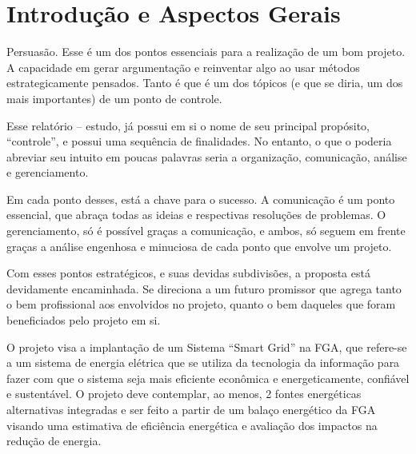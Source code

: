 \chapter[Introdução e Aspectos Gerais]{Introdução e Aspectos Gerais}

Persuasão. Esse é um dos pontos essenciais para a realização de um bom projeto. A capacidade em gerar argumentação e reinventar algo ao usar métodos estrategicamente pensados. Tanto é que é um dos tópicos (e que se diria, um dos mais importantes) de um ponto de controle.

Esse relatório – estudo, já possui em si o nome de seu principal propósito, “controle”, e possui uma sequência de finalidades. No entanto, o que o poderia abreviar seu intuito em poucas palavras seria a organização, comunicação, análise e gerenciamento.

Em cada ponto desses, está a chave para o sucesso. A comunicação é um ponto essencial, que abraça todas as ideias e respectivas resoluções de problemas.  O gerenciamento, só é possível graças a comunicação, e ambos, só seguem em frente graças a análise engenhosa e minuciosa de cada ponto que envolve um projeto.  

Com esses pontos estratégicos, e suas devidas subdivisões, a proposta está devidamente encaminhada.  Se direciona a um futuro promissor que agrega tanto o bem profissional aos envolvidos no projeto, quanto o bem daqueles que foram beneficiados pelo projeto em si.

O projeto visa a implantação de um Sistema “Smart Grid” na FGA, que refere-se a um sistema de energia elétrica que se utiliza da tecnologia da informação para fazer com que o sistema seja mais eficiente econômica e energeticamente, confiável e sustentável. O projeto deve contemplar, ao menos, 2 fontes energéticas alternativas integradas e ser feito a partir de um balaço energético da FGA visando uma estimativa de eficiência energética e avaliação dos impactos na redução de energia.